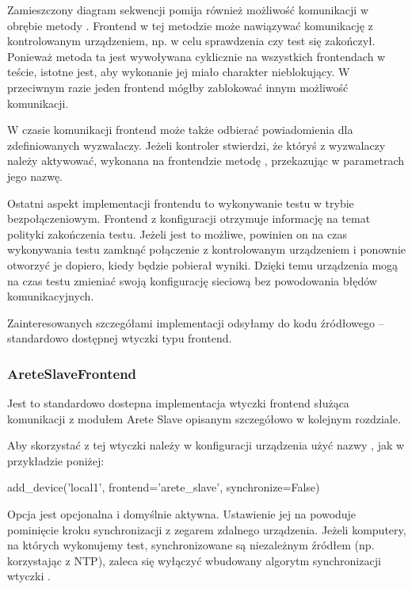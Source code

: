 \documentclass[00-praca-magisterska.tex]{subfiles}
\begin{document}
Zamieszczony diagram sekwencji pomija również możliwość komunikacji w obrębie
metody . Frontend w tej metodzie może nawiązywać
komunikację z kontrolowanym urządzeniem, np. w celu sprawdzenia czy test się
zakończył. Ponieważ metoda ta jest wywoływana cyklicznie na wszystkich
frontendach w teście, istotne jest, aby wykonanie jej miało charakter
nieblokujący. W przeciwnym razie jeden frontend mógłby zablokować innym
możliwość komunikacji.

W czasie komunikacji frontend może także odbierać powiadomienia dla
zdefiniowanych wyzwalaczy. Jeżeli kontroler stwierdzi, że któryś z wyzwalaczy
należy aktywować, wykonana na frontendzie metodę , przekazując w
parametrach jego nazwę.

Ostatni aspekt implementacji frontendu to wykonywanie testu w trybie
bezpołączeniowym. Frontend z konfiguracji otrzymuje informację na temat
polityki zakończenia testu. Jeżeli jest to możliwe, powinien on na czas
wykonywania testu zamknąć połączenie z kontrolowanym urządzeniem i ponownie
otworzyć je dopiero, kiedy będzie pobierał wyniki. Dzięki temu urządzenia mogą
na czas testu zmieniać swoją konfigurację sieciową bez powodowania błędów
komunikacyjnych.

Zainteresowanych szczegółami implementacji odsyłamy do kodu źródłowego
 -- standardowo dostępnej wtyczki typu frontend.

\subsubsection{AreteSlaveFrontend}

Jest to standardowo dostepna implementacja wtyczki frontend służąca komunikacji
z modułem Arete Slave opisanym szczegółowo w kolejnym rozdziale.

Aby skorzystać z tej wtyczki należy w konfiguracji urządzenia użyć nazwy
, jak w przykładzie poniżej:

\begin{pythoncode}
  add_device('local1',
    frontend='arete_slave',
    synchronize=False)
\end{pythoncode}

Opcja  jest opcjonalna i domyślnie aktywna. Ustawienie jej na
 powoduje pominięcie kroku synchronizacji z zegarem zdalnego
urządzenia. Jeżeli komputery, na których wykonujemy test, synchronizowane są
niezależnym źródłem (np. korzystając z NTP), zaleca się wyłączyć wbudowany
algorytm synchronizacji wtyczki .
\end{document}
